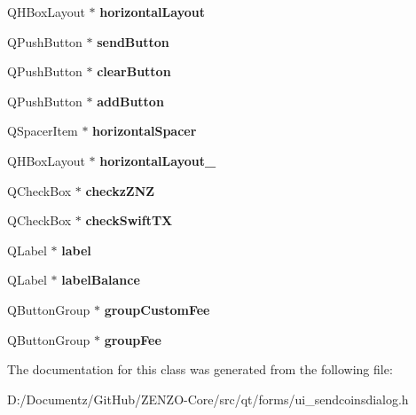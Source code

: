 \begin{DoxyCompactItemize}
\item 
\mbox{\label{class_ui___send_coins_dialog_a01a7edabac617d920c925f20e84688cb}} 
Q\+H\+Box\+Layout $\ast$ {\bfseries horizontal\+Layout}
\item 
\mbox{\label{class_ui___send_coins_dialog_adfda2330cf7fa24f7a55eef36e5b9f0e}} 
Q\+Push\+Button $\ast$ {\bfseries send\+Button}
\item 
\mbox{\label{class_ui___send_coins_dialog_abf83f5667dff9e6f2292ce526754d6bf}} 
Q\+Push\+Button $\ast$ {\bfseries clear\+Button}
\item 
\mbox{\label{class_ui___send_coins_dialog_abd6c2263b7d224be4fa15247ef78ac76}} 
Q\+Push\+Button $\ast$ {\bfseries add\+Button}
\item 
\mbox{\label{class_ui___send_coins_dialog_a79a89707bd6fbb0e9ba368ac44649c11}} 
Q\+Spacer\+Item $\ast$ {\bfseries horizontal\+Spacer}
\item 
\mbox{\label{class_ui___send_coins_dialog_a894374eb370b3a00909ace8d2bcfd260}} 
Q\+H\+Box\+Layout $\ast$ {\bfseries horizontal\+Layout\+\_}
\item 
\mbox{\label{class_ui___send_coins_dialog_a0ecbf2d8393c33ac1a6d996723eb5dd0}} 
Q\+Check\+Box $\ast$ {\bfseries checkz\+Z\+NZ}
\item 
\mbox{\label{class_ui___send_coins_dialog_a343a2744c44265ca6e41b2063d4c3de8}} 
Q\+Check\+Box $\ast$ {\bfseries check\+Swift\+TX}
\item 
\mbox{\label{class_ui___send_coins_dialog_a11b8317ae33d031672a5dac5acdee7d6}} 
Q\+Label $\ast$ {\bfseries label}
\item 
\mbox{\label{class_ui___send_coins_dialog_a0a53503c5889241cda596e9cfde6d42c}} 
Q\+Label $\ast$ {\bfseries label\+Balance}
\item 
\mbox{\label{class_ui___send_coins_dialog_a93dd67e7e15b9007c9c0bb3f32024f96}} 
Q\+Button\+Group $\ast$ {\bfseries group\+Custom\+Fee}
\item 
\mbox{\label{class_ui___send_coins_dialog_a5c402c331b0ec0d1dd4a88c1be3f234a}} 
Q\+Button\+Group $\ast$ {\bfseries group\+Fee}
\end{DoxyCompactItemize}


The documentation for this class was generated from the following file\+:\begin{DoxyCompactItemize}
\item 
D\+:/\+Documentz/\+Git\+Hub/\+Z\+E\+N\+Z\+O-\/\+Core/src/qt/forms/ui\+\_\+sendcoinsdialog.\+h\end{DoxyCompactItemize}
